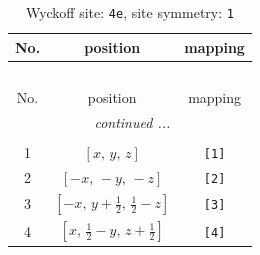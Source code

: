 \documentclass[fleqn,8pt]{jsarticle}
\begin{document}
\begin{longtable}{ccc}
\caption{Wyckoff site: {\tt 4e}, site symmetry: {\tt 1}}
 \\
 \hline \hline
No. & position & mapping \\ \hline \endfirsthead

\multicolumn{2}{l}{\tablename\ \thetable{}} \\
 \hline \hline
No. & position & mapping \\ \hline \endhead

 \hline \hline
\multicolumn{2}{r}{\footnotesize\it continued ...} \\ \endfoot

 \hline \hline
\multicolumn{2}{r}{} \\ \endlastfoot

1 & $\left[ x,\, y,\, z \right]$ & {\tt [1]} \\ \hline
2 & $\left[ - x,\, - y,\, - z \right]$ & {\tt [2]} \\ \hline
3 & $\left[ - x,\, y + \frac{1}{2},\, \frac{1}{2} - z \right]$ & {\tt [3]} \\ \hline
4 & $\left[ x,\, \frac{1}{2} - y,\, z + \frac{1}{2} \right]$ & {\tt [4]} \\
\end{longtable}
\end{document}
